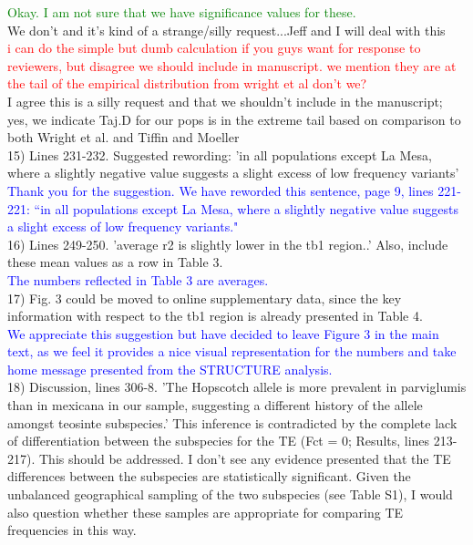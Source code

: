 \documentclass[11pt]{article}
\newcommand{\res}[1]{\noindent \textcolor{blue}{{#1}} \\}
\newcommand{\jri}[1]{\noindent \textcolor{red}{{#1}} \\}
\newcommand{\lev}[1]{\noindent \textcolor{green}{{#1}} \\}
\newcommand{\mbh}[1]{\noindent \textcolor{Dandelion}{{#1}}\\}
\begin{document}
\lev{Okay. I am not sure that we have significance values for these.}

\mbh{We don't and it's kind of a strange/silly request...Jeff and I will deal with this}
\jri{ i can do the simple but dumb calculation if you guys want for response to reviewers, but disagree we should include in manuscript. we mention they are at the tail of the empirical distribution from wright et al don't we?}
\mbh{I agree this is a silly request and that we shouldn't include in the manuscript; yes, we indicate Taj.D for our pops is in the extreme tail based on comparison to both Wright et al. and Tiffin and Moeller}

15) Lines 231-232. Suggested rewording: 'in all populations except La Mesa, where a slightly negative value suggests a slight excess of low frequency variants'\\

\res{Thank you for the suggestion. We have reworded this sentence, page 9, lines 221-221: ``in all populations except La Mesa, where a slightly negative value suggests a slight excess of low frequency variants."}

16) Lines 249-250. 'average r2 is slightly lower in the tb1 region..' Also, include these mean values as a row in Table 3.\\

\res{The numbers reflected in Table 3 are averages.}

17) Fig. 3 could be moved to online supplementary data, since the key information with respect to the tb1 region is already presented in Table 4. \\

\res{We appreciate this suggestion but have decided to leave Figure 3 in the main text, as we feel it provides a nice visual representation for the numbers and take home message presented from the STRUCTURE analysis.}

18) Discussion, lines 306-8. 'The Hopscotch allele is more prevalent in parviglumis than in mexicana in our sample, suggesting a different history of the allele amongst teosinte subspecies.' This inference is contradicted by the complete lack of differentiation between the subspecies for the TE (Fct = 0; Results, lines 213-217). This should be addressed. I don't see any evidence presented that the TE differences between the subspecies are statistically significant. Given the unbalanced geographical sampling of the two subspecies (see Table S1), I would also question whether these samples are appropriate for comparing TE frequencies in this way. \\
\end{document}
